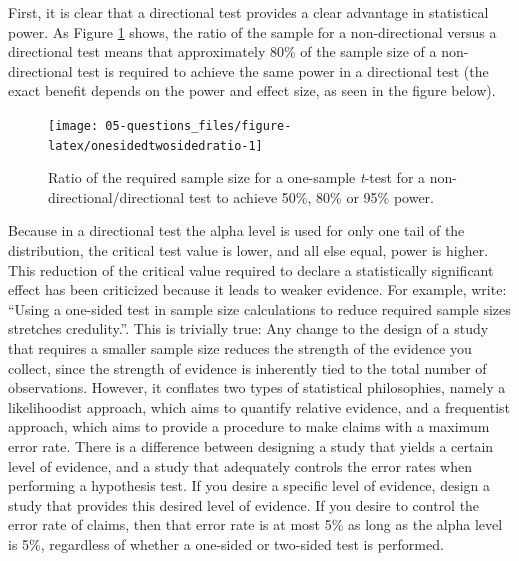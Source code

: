 \documentclass[
  oneside]{book}
\begin{document}
First, it is clear that a directional test provides a clear advantage in statistical power. As Figure \ref{fig:onesidedtwosidedratio} shows, the ratio of the sample for a non-directional versus a directional test means that approximately 80\% of the sample size of a non-directional test is required to achieve the same power in a directional test (the exact benefit depends on the power and effect size, as seen in the figure below).



\begin{figure}

{\centering \texttt{[image: 05-questions\_files/figure-latex/onesidedtwosidedratio-1]} 

}

\caption{Ratio of the required sample size for a one-sample \emph{t}-test for a non-directional/directional test to achieve 50\%, 80\% or 95\% power.}\label{fig:onesidedtwosidedratio}
\end{figure}

Because in a directional test the alpha level is used for only one tail of the distribution, the critical test value is lower, and all else equal, power is higher. This reduction of the critical value required to declare a statistically significant effect has been criticized because it leads to weaker evidence. For example, \citet{schulz_sample_2005} write: ``Using a one-sided test in sample size calculations to reduce required sample sizes stretches credulity.''. This is trivially true: Any change to the design of a study that requires a smaller sample size reduces the strength of the evidence you collect, since the strength of evidence is inherently tied to the total number of observations. However, it conflates two types of statistical philosophies, namely a likelihoodist approach, which aims to quantify relative evidence, and a frequentist approach, which aims to provide a procedure to make claims with a maximum error rate. There is a difference between designing a study that yields a certain level of evidence, and a study that adequately controls the error rates when performing a hypothesis test. If you desire a specific level of evidence, design a study that provides this desired level of evidence. If you desire to control the error rate of claims, then that error rate is at most 5\% as long as the alpha level is 5\%, regardless of whether a one-sided or two-sided test is performed.
\end{document}
